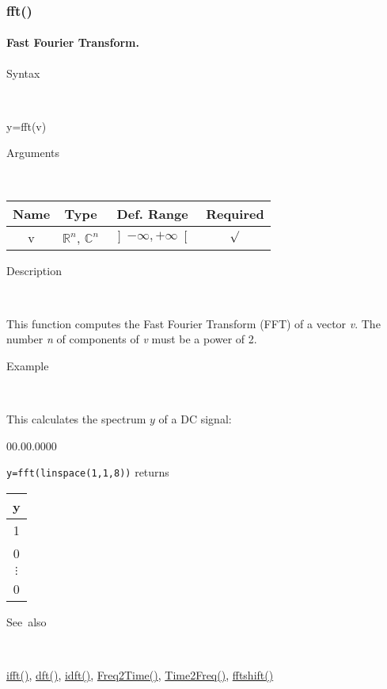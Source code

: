 \newpage
\subsubsection*{\hypertarget{fft}{}{\Large fft()}}


\paragraph{\label{par:Fast-Fourier-Transform}Fast Fourier Transform.}

\begin{description}
\item [Syntax]~
\end{description}
y=fft(v)

\begin{description}
\item [Arguments]~
\end{description}
\begin{tabular}{|c|c|c|c|}
\hline 
Name&
Type&
Def. Range&
Required\tabularnewline
\hline
\hline 
v&
$\mathbb{R}^{n}$, $\mathbb{C}^{n}$&
$\left]-\infty,+\infty\right[$&
$\surd$\tabularnewline
\hline 
\end{tabular}

\begin{description}
\item [Description]~
\end{description}
This function computes the Fast Fourier Transform (FFT) of a vector
\textit{v}. The number \textit{n} of components of \textit{v} must be
a power of 2.

\begin{description}
\item [Example]~
\end{description}
This calculates the spectrum $y$ of a DC signal:

\begin{lyxlist}{00.00.0000}
\item [\texttt{y=fft(linspace(1,1,8))}]returns \begin{tabular}{|c|}
\hline 
y\tabularnewline
\hline
\hline 
1\tabularnewline
\hline 
0\tabularnewline
\hline 
$\vdots$\tabularnewline
\hline 
0\tabularnewline
\hline
\end{tabular}
\end{lyxlist}
\begin{description}
\item [See~also]~
\end{description}
\textcolor{blue}{\hyperlink{ifft}{ifft()}}\textcolor{black}{,} \textcolor{blue}{\hyperlink{dft}{dft()}}\textcolor{black}{,}
\textcolor{blue}{\hyperlink{idft}{idft()}}\textcolor{black}{,}
\textcolor{blue}{\hyperlink{Freq2Time}{Freq2Time()}}\textcolor{black}{,}
\textcolor{blue}{\hyperlink{Time2Freq}{Time2Freq()}}\textcolor{black}{,}
\textcolor{blue}{\hyperlink{fftshift}{fftshift()}}



